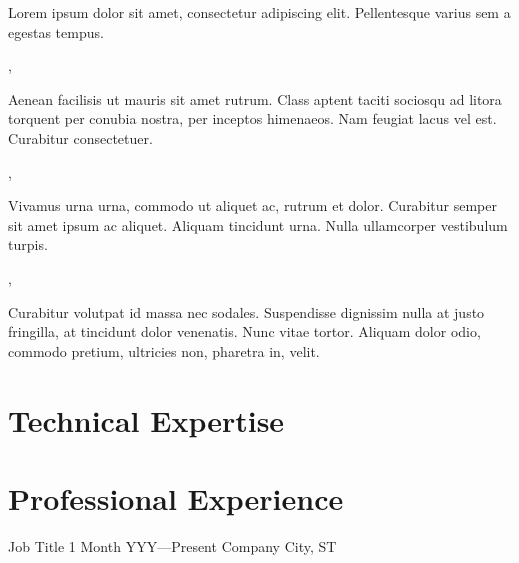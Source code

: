 \documentclass{james-cv}
\begin{document}
\maketitle{}



\begin{summary}

Lorem ipsum dolor sit amet, consectetur adipiscing elit. Pellentesque varius sem
a egestas tempus.

\sep{}

Aenean facilisis ut mauris sit amet rutrum. Class aptent taciti sociosqu ad
litora torquent per conubia nostra, per inceptos himenaeos. Nam feugiat lacus
vel est. Curabitur consectetuer.

\sep{}

Vivamus urna urna, commodo ut aliquet ac, rutrum et dolor. Curabitur semper sit
amet ipsum ac aliquet. Aliquam tincidunt urna. Nulla ullamcorper vestibulum
turpis.

\sep{}

Curabitur volutpat id massa nec sodales. Suspendisse dignissim nulla at justo
fringilla, at tincidunt dolor venenatis. Nunc vitae tortor. Aliquam dolor odio,
commodo pretium, ultricies non, pharetra in, velit.

\end{summary}


\section{Technical Expertise}
\begin{allskills}
\end{allskills}


\section{Professional Experience}
\employment
  {Job Title 1}
  {Month YYY---Present}
  {Company}
  {City, ST}
\end{document}
